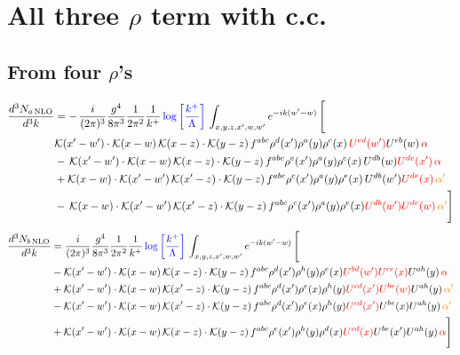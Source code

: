 \documentclass[9pt]{article}
\numberwithin{equation}{section}
\begin{document}
\section{All three $\rho$ term with c.c.}
\subsection{From four $\rho$'s}
\begin{align}
    \frac{d^{3}N_{a\,\rm NLO}}{d^{3}k} & = -\,\frac{i}{(2\pi)^{3}}\frac{g^{4}}{8\pi^{3}}\frac{1}{2\pi^{2}} \frac{1}{k^{+}}\,{\color{blue}\log{\left[\frac{k^{+}}{\Lambda}\right]}}\,\int_{x,y,z,x^{\prime},w,w^{\prime}}e^{-ik(w^{\prime}-w)}\, \Bigg[\notag \\ &  \mathcal{K}(x'-w')\cdot \mathcal{K}(x-w)\, \mathcal{K}(x-z)\cdot \mathcal{K}(y-z)\, f^{a b c} \rho^{d}(x') \rho^{a}(y) \rho^{c}(x)\,{\color{red}U^{ed}(w')} U^{e b}(w)\, {\color{red} \alpha} \nonumber\\
    &  -\,\mathcal{K}(x'-w')\cdot \mathcal{K}(x-w)\, \mathcal{K}(x-z)\cdot \mathcal{K}(y-z)\, f^{a b c} \rho^{e}(x') \rho^{a}(y) \rho^{c}(x)\, U^{d b}(w) {\color{red}U^{de}(x')}\, {\color{red} \alpha}\nonumber\\
    & + \mathcal{K}(x-w)\cdot \mathcal{K}(x'-w')\, \mathcal{K}(x'-z)\cdot \mathcal{K}(y-z)\, f^{a b c} \rho^{c}(x') \rho^{a}(y) \rho^{e}(x)\,U^{d b}(w') {\color{red}U^{de}(x)}\, {\color{orange} \alpha'} \nonumber\\
    & -\,\mathcal{K}(x-w)\cdot \mathcal{K}(x'-w')\, \mathcal{K}(x'-z)\cdot \mathcal{K}(y-z)\, f^{a b c} \rho^{c}(x') \rho^{a}(y) \rho^{e}(x) {\color{red}U^{db}(w')} {\color{red}U^{de}(w)}\, {\color{orange} \alpha'}\Bigg]
\end{align}
\begin{align}
      \frac{d^{3}N_{b\,\rm NLO}}{d^{3}k} & = \frac{i}{(2\pi)^{3}}\frac{g^{4}}{8\pi^{3}}\frac{1}{2\pi^{2}} \frac{1}{k^{+}}\,{\color{blue}\log{\left[\frac{k^{+}}{\Lambda}\right]}}\,\int_{x,y,z,x^{\prime},w,w^{\prime}}e^{-ik(w^{\prime}-w)}\, \Bigg[\notag \\ & - \mathcal{K}(x'-w')\cdot \mathcal{K}(x-w)\, \mathcal{K}(x-z)\cdot \mathcal{K}(y-z)\, f^{a b c} \rho^{d}(x') \rho^{h}(y) \rho^{e}(x) {\color{red}U^{bd}(w')} {\color{red}U^{ce}(x)} U^{a h}(y)\, {\color{red} \alpha}\nonumber\\
    &+ \mathcal{K}(x'-w')\cdot \mathcal{K}(x-w)\,\mathcal{K}(x'-z)\cdot \mathcal{K}(y-z)\, f^{a b c} \rho^{d}(x') \rho^{e}(x) \rho^{h}(y) {\color{red}U^{cd}(x')} {\color{red}U^{be}(w)} U^{a h}(y)\, {\color{orange} \alpha'}\nonumber\\
    &- \mathcal{K}(x'-w')\cdot \mathcal{K}(x-w)\,\mathcal{K}(x'-z)\cdot \mathcal{K}(y-z)\, f^{a b c} \rho^{d}(x') \rho^{e}(x) \rho^{h}(y) {\color{red}U^{cd}(x')} U^{b e}(x) U^{a h}(y)\, {\color{orange} \alpha'}\nonumber\\
    &+  \mathcal{K}(x'-w')\cdot \mathcal{K}(x-w)\, \mathcal{K}(x-z)\cdot \mathcal{K}(y-z)\, f^{a b c} \rho^{e}(x') \rho^{h}(y) \rho^{d}(x) {\color{red}U^{cd}(x)} U^{b e}(x') U^{a h}(y)\, {\color{red} \alpha} \Bigg]
\end{align}
\end{document}
